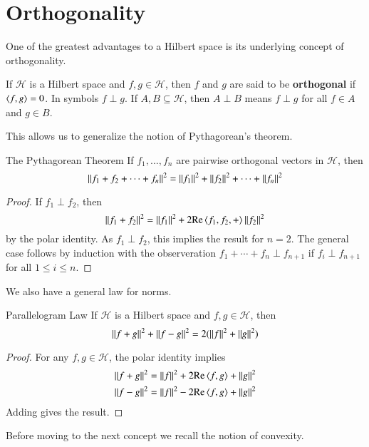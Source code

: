 \section{Orthogonality}
\label{sec:ortho}

One of the greatest advantages to a Hilbert space is its underlying concept of orthogonality.

\begin{defn}
    If $\mathscr{H}$ is a Hilbert space and $f,g \in \mathscr{H}$, then $f$ and $g$ are said to be \textbf{orthogonal} if $\left\langle f, g\right\rangle = 0$. In symbols $f\perp g$. If $A,B \subseteq \mathscr{H}$, then $A\perp B$ means $f\perp g$ for all $f \in A$ and $g \in B$.
\end{defn}

This allows us to generalize the notion of Pythagorean's theorem.

\begin{nthm}{The Pythagorean Theorem}
    If $f_1,...,f_n$ are pairwise orthogonal vectors in $\mathscr{H}$, then $$\left|\left| f_1+f_2+\cdots+f_n\right|\right|^2 = \left|\left| f_1\right|\right|^2+\left|\left| f_2\right|\right|^2+\cdots+\left|\left| f_n\right|\right|^2$$
\end{nthm}
\begin{proof}
    If $f_1\perp f_2$, then $$\left|\left| f_1+f_2\right|\right|^2 = \left|\left| f_1\right|\right|^2+2\text{Re}\left\langle f_1,f_2, +\right\rangle\left|\left| f_2\right|\right|^2$$
    by the polar identity. As $f_1\perp f_2$, this implies the result for $n = 2$. The general case follows by induction with the observeration $f_1+\cdots+f_n\perp f_{n+1}$ if $f_i\perp f_{n+1}$ for all $1 \leq i \leq n$.
\end{proof}

We also have a general law for norms.

\begin{nthm}{Parallelogram Law}
    If $\mathscr{H}$ is a Hilbert space and $f,g \in \mathscr{H}$, then $$\left|\left| f+g\right|\right|^2+\left|\left| f-g\right|\right|^2 = 2(\left|\left| f\right|\right|^2+\left|\left| g\right|\right|^2)$$
\end{nthm}
\begin{proof}
    For any $f,g \in \mathscr{H}$, the polar identity implies \begin{align*}
        \left|\left| f+g\right|\right|^2 &= \left|\left| f\right|\right|^2+2\text{Re}\left\langle f, g\right\rangle+\left|\left| g\right|\right|^2 \\
        \left|\left| f-g\right|\right|^2 &= \left|\left| f\right|\right|^2-2\text{Re}\left\langle f, g\right\rangle+\left|\left| g\right|\right|^2
    \end{align*}
    Adding gives the result.
\end{proof}

Before moving to the next concept we recall the notion of convexity.

